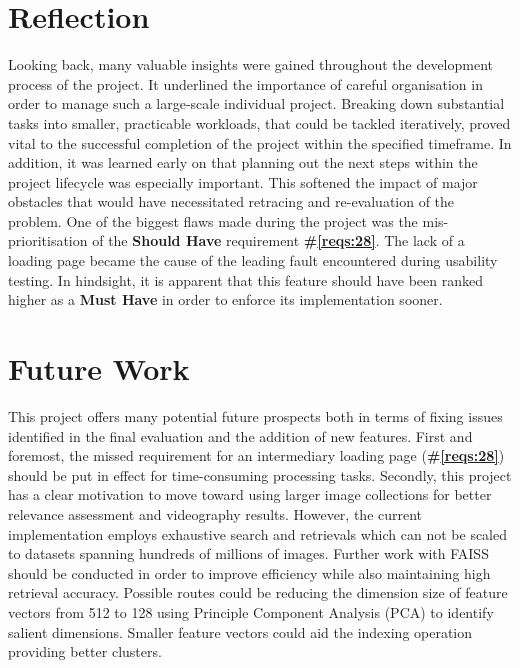 \documentclass{l4proj}
\begin{document}
\section{Reflection}
Looking back, many valuable insights were gained throughout the development process of the project. It underlined the importance of careful organisation in order to manage such a large-scale individual project. Breaking down substantial tasks into smaller, practicable workloads, that could be tackled iteratively, proved vital to the successful completion of the project within the specified timeframe. In addition, it was learned early on that planning out the next steps within the project lifecycle was especially important. This softened the impact of major obstacles that would have necessitated retracing and re-evaluation of the problem. One of the biggest flaws made during the project was the mis-prioritisation of the \textbf{Should Have} requirement \textbf{\#\ref{reqs:28}}. The lack of a loading page became the cause of the leading fault encountered during usability testing. In hindsight, it is apparent that this feature should have been ranked higher as a \textbf{Must Have} in order to enforce its implementation sooner.


\section{Future Work}
\label{sec:future_work}
This project offers many potential future prospects both in terms of fixing issues identified in the final evaluation and the addition of new features. First and foremost, the missed requirement for an intermediary loading page (\textbf{\#\ref{reqs:28}}) should be put in effect for time-consuming processing tasks. Secondly, this project has a clear motivation to move toward using larger image collections for better relevance assessment and videography results. However, the current implementation employs exhaustive search and retrievals which can not be scaled to datasets spanning hundreds of millions of images. Further work with FAISS should be conducted in order to improve efficiency while also maintaining high retrieval accuracy. Possible routes could be reducing the dimension size of feature vectors from 512 to 128 using Principle Component Analysis (PCA) to identify salient dimensions. Smaller feature vectors could aid the indexing operation providing better clusters.
\end{document}
